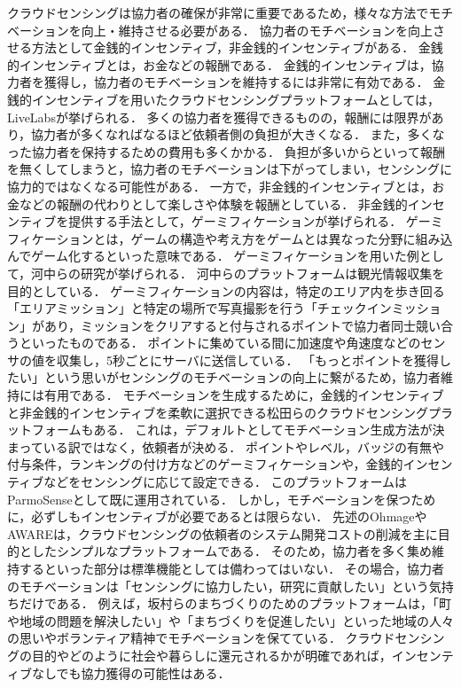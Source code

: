 クラウドセンシングは協力者の確保が非常に重要であるため，様々な方法でモチベーションを向上・維持させる必要がある．
協力者のモチベーションを向上させる方法として金銭的インセンティブ，非金銭的インセンティブがある．
金銭的インセンティブとは，お金などの報酬である．
金銭的インセンティブは，協力者を獲得し，協力者のモチベーションを維持するには非常に有効である．
金銭的インセンティブを用いたクラウドセンシングプラットフォームとしては，LiveLabs\cite{jaya}が挙げられる．
多くの協力者を獲得できるものの，報酬には限界があり，協力者が多くなればなるほど依頼者側の負担が大きくなる．
また，多くなった協力者を保持するための費用も多くかかる．
負担が多いからといって報酬を無くしてしまうと，協力者のモチベーションは下がってしまい，センシングに協力的ではなくなる可能性がある．
一方で，非金銭的インセンティブとは，お金などの報酬の代わりとして楽しさや体験を報酬としている．
非金銭的インセンティブを提供する手法として，ゲーミフィケーションが挙げられる\cite{ara}．
ゲーミフィケーションとは，ゲームの構造や考え方をゲームとは異なった分野に組み込んでゲーム化するといった意味である．
ゲーミフィケーションを用いた例として，河中らの研究\cite{kawa}が挙げられる．
河中らのプラットフォームは観光情報収集を目的としている．
ゲーミフィケーションの内容は，特定のエリア内を歩き回る「エリアミッション」と特定の場所で写真撮影を行う「チェックインミッション」があり，ミッションをクリアすると付与されるポイントで協力者同士競い合うといったものである．
ポイントに集めている間に加速度や角速度などのセンサの値を収集し，5秒ごとにサーバに送信している．
「もっとポイントを獲得したい」という思いがセンシングのモチベーションの向上に繋がるため，協力者維持には有用である．
モチベーションを生成するために，金銭的インセンティブと非金銭的インセンティブを柔軟に選択できる松田らのクラウドセンシングプラットフォーム\cite{matsu}もある．
これは，デフォルトとしてモチベーション生成方法が決まっている訳ではなく，依頼者が決める．
ポイントやレベル，バッジの有無や付与条件，ランキングの付け方などのゲーミフィケーションや，金銭的インセンティブなどをセンシングに応じて設定できる．
このプラットフォームはParmoSense\cite{Parmo}として既に運用されている．
しかし，モチベーションを保つために，必ずしもインセンティブが必要であるとは限らない．
先述のOhmageやAWAREは，クラウドセンシングの依頼者のシステム開発コストの削減を主に目的としたシンプルなプラットフォームである．
そのため，協力者を多く集め維持するといった部分は標準機能としては備わってはいない．
その場合，協力者のモチベーションは「センシングに協力したい，研究に貢献したい」という気持ちだけである．
例えば，坂村らのまちづくりのためのプラットフォーム\cite{mina}は，「町や地域の問題を解決したい」や「まちづくりを促進したい」といった地域の人々の思いやボランティア精神でモチベーションを保てている．
クラウドセンシングの目的やどのように社会や暮らしに還元されるかが明確であれば，インセンティブなしでも協力獲得の可能性はある．


